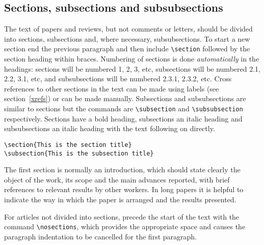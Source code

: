 \subsection{Sections, subsections and subsubsections}
The text of papers and reviews, but not comments or letters, should be
divided into sections, subsections and, where necessary,
subsubsections. To start a new section end the previous paragraph and
then include \verb"\section" followed by the section heading within braces.
Numbering of sections is done {\it automatically} in the headings:
sections will be numbered 1, 2, 3, etc, subsections will be numbered
2.1, 2.2,  3.1, etc, and subsubsections will be numbered 2.3.1, 2.3.2,
etc.  Cross references to other sections in the text can be made using
labels (see section~\ref{xrefs}) or can
be made manually. Subsections and subsubsections are similar to sections but
the commands are \verb"\subsection" and \verb"\subsubsection" respectively.
Sections have a bold heading, subsections an italic heading and
subsubsections an italic heading with the text following on directly.
\begin{verbatim}
\section{This is the section title}
\subsection{This is the subsection title}
\end{verbatim}


The first section is normally an introduction,  which should state clearly
the object of the work, its scope and the main advances reported, with
brief references to relevant results by other workers. In long papers it is
helpful to indicate the way in which the paper is arranged and the results
presented.

For articles not divided into sections, precede the
start of the text with the command \verb"\nosections", which provides the
appropriate space and causes the paragraph indentation to be cancelled
for the first paragraph.

